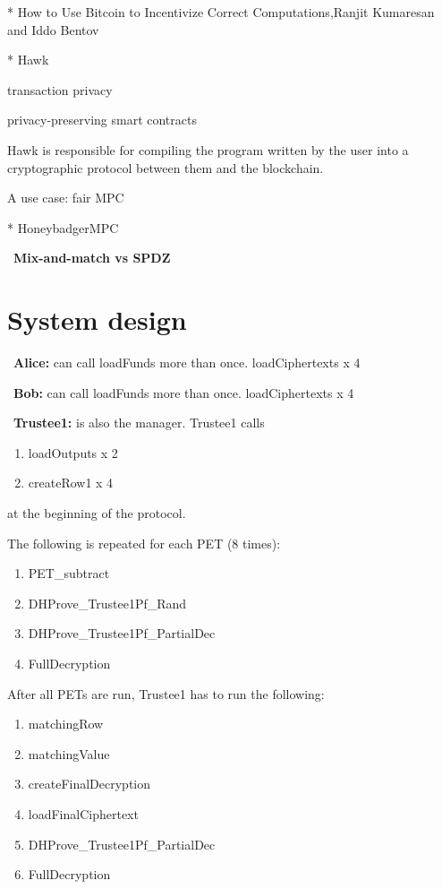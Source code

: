 * How to Use Bitcoin to Incentivize Correct Computations,Ranjit Kumaresan and Iddo Bentov

* Hawk~\cite{kosba2016hawk}

transaction privacy

privacy-preserving smart contracts

Hawk is responsible for compiling the program written by the user into a cryptographic protocol between them and the blockchain.

A use case: fair MPC

* HoneybadgerMPC~\cite{lu2019honeybadgermpc}



~\textbf{Mix-and-match vs SPDZ}
\section{System design}

~\textbf{Alice:} can call loadFunds more than once. loadCiphertexts  x 4

~\textbf{Bob:} can call loadFunds more than once. loadCiphertexts x 4

~\textbf{Trustee1:} is also the manager. Trustee1 calls  
\begin{enumerate}
	\item loadOutputs  x 2
	\item  createRow1  x 4
\end{enumerate}
at the beginning of the protocol. 
\newline

The following is repeated for each PET (8 times): 
\begin{enumerate}
	\item PET\_subtract
	\item DHProve\_Trustee1Pf\_Rand
	\item DHProve\_Trustee1Pf\_PartialDec
	 \item FullDecryption
\end{enumerate}

After all PETs are run, Trustee1 has to run the following:
\begin{enumerate}
	\item matchingRow
	\item matchingValue
	\item createFinalDecryption
	\item loadFinalCiphertext
	\item DHProve\_Trustee1Pf\_PartialDec
	\item FullDecryption
\end{enumerate}

